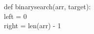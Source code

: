 \documentclass[preview]{standalone}
\begin{document}
def binarysearch(arr, target):\\left = 0\\right = len(arr) - 1\\
\end{document}
